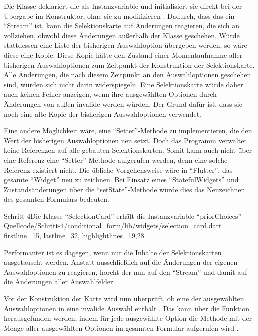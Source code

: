 Die Klasse  deklariert die  als Instanzvariable 
und initialisiert sie direkt bei der Übergabe im Konstruktor,
ohne sie zu modifizieren .
Dadurch, dass das  ein \enquote{Stream} ist,
kann die Selektionskarte auf Änderungen reagieren,
die sich an  vollziehen,
obwohl diese Änderungen außerhalb der Klasse geschehen.
Würde stattdessen eine Liste der bisherigen Auswahloption übergeben werden,
so wäre diese eine Kopie.
Diese Kopie hätte den Zustand einer Momentaufnahme aller bisherigen Auswahloptionen zum Zeitpunkt der Konstruktion der Selektionskarte.
Alle Änderungen,
die nach diesem Zeitpunkt an den Auswahloptionen geschehen sind,
würden sich nicht darin widerspiegeln.
Eine Selektionskarte würde daher auch keinen Fehler anzeigen,
wenn ihre ausgewählten Optionen durch Änderungen von außen invalide werden würden.
Der Grund dafür ist,
dass sie noch eine alte Kopie der bisherigen Auswahloptionen verwendet.

Eine andere Möglichkeit wäre,
eine \enquote{Setter}-Methode zu implementieren,
die den Wert der bisherigen Auswahloptionen neu setzt.
Doch das Programm verwaltet keine Referenzen auf alle gebauten Selektionskarten.
Somit kann auch nicht über eine Referenz eine \enquote{Setter}-Methode aufgerufen werden,
denn eine solche Referenz existiert nicht. 
Die übliche Vorgehensweise wäre in \enquote{Flutter},
das gesamte \enquote{Widget} neu zu zeichnen.
Bei Einsatz eines \enquote{StatefulWidgets} und Zustandsänderungen über die \enquote{setState}-Methode würde dies das Neuzeichnen des gesamten Formulars bedeuten.


\begin{alexlisting}{Schritt 4}{Die Klasse \enquote{SelectionCard} erhält die Instanzvariable \enquote{priorChoices}}
  {Quellcode/Schritt-4/conditional_form/lib/widgets/selection_card.dart}
  {firstline=15, lastline=32, highlightlines={19,28}}
  \label{lst:Schritt4SelectionCardPriorChoices}
\end{alexlisting} 


Performanter ist es dagegen,
wenn nur die Inhalte der Selektionskarten ausgetauscht werden.
Anstatt ausschließlich auf die Änderungen der eigenen Auswahloptionen zu reagieren,
horcht der  nun auf den \enquote{Stream}  
und damit auf die Änderungen aller Auswahlfelder.

Vor der Konstruktion der Karte wird nun überprüft,
ob eine der ausgewählten Auswahloptionen in  eine invalide Auswahl enthält .
Das kann über die Funktion  herausgefunden werden,
indem  für jede ausgewählte Option die Methode  mit der Menge aller ausgewählten Optionen im gesamten Formular aufgerufen wird . 

